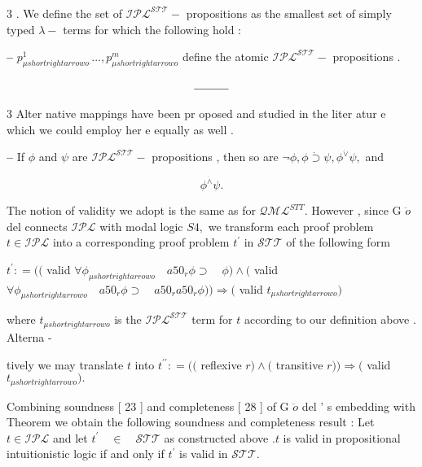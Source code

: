 \documentclass[10pt]{article}
\begin{document}
3 . \quad We define the set of  $ \mathcal{IPL} ^{ \mathcal{STT} } - $  propositions as the smallest set of simply typed 
  $ \lambda  - $  terms for which the following hold : 

\centerline{\textbf{-- }  $ p ^{ 1 }_{ \mu  shortrightarrow  o ^{ , }}  .   .   .   ,   p ^{ m }_{ \mu  shortrightarrow  o }$  define the atomic  $ \mathcal{IPL} ^{ \mathcal{STT} } - $  propositions . }

\begin{align*}
 \rule{3em}{0.4pt} 
\end{align*}

{\scriptsize 3 } {\small Alter native mappings have been pr oposed and studied in the liter atur e which we } 
 {\small could employ her e equally as well . } 


\newpage
\hspace*{\fill}\textbf{-- } If  $ \phi $  and  $ \psi $  are  $ \mathcal{IPL} ^{ \mathcal{STT} } - $  propositions , then so are  $\neg{ \dot{} }  \phi  ,   \phi   \dot{\supset}   \psi  ,   \phi ^{ \dot{\vee} }  \psi  , $  and 

\[ \phi ^{ \dot{\wedge} }  \psi  . \]


The notion of validity we adopt is the same as for  $ \mathcal{QML} ^{ STT } . $  However , since 
 G  $ \ddot{o} $  del connects  $ \mathcal{IPL} $  with modal logic  $ S  4  , $  we transform each proof problem 
  $ t   \in   \mathcal{IPL} $  into a corresponding proof problem  $ t ^{ \prime }$  in  $ \mathcal{STT} $  of the following form 

\noindent  $ t ^{ \prime }  :  =   (  ( $  valid  $ \forall  \phi _{ \mu  shortrightarrow  o } \quad  a50 _{ r }  \phi   \supset  \quad  \phi  )   \wedge   ( $  valid  $ \forall  \phi _{ \mu  shortrightarrow  o } \quad  a50 _{ r }  \phi   \supset  \quad  a50 _{ r }  a50 _{ r }  \phi  )  )   \Rightarrow   ( $  valid  $ t _{ \mu  shortrightarrow  o } ) $  

\noindent where  $ t _{ \mu  shortrightarrow  o }$  is the  $ \mathcal{IPL} ^{ \mathcal{STT} }$  term for  $ t $  according to our definition above . Alterna - 

\noindent tively we may translate  $ t $  into  $ t ^{ \prime  \prime }  :  =   (  ( $  reflexive  $ r  )   \wedge   ( $  transitive  $ r  )  )   \Rightarrow   ( $  valid  $ t _{ \mu  shortrightarrow  o } )  . $  

Combining soundness [ 23 ] and completeness [ 28 ] of G  $ \ddot{o} $  del ' s embedding with 
 Theorem  \quad we obtain the following soundness \quad and completeness \quad result : \quad Let 
  $ t   \in   \mathcal{IPL} $  and let  $ t ^{ \prime } \quad  \in  \quad  \mathcal{STT} $  as constructed above  $ .   t $  is valid in propositional 
 intuitionistic logic if and only if  $ t ^{ \prime }$  is valid in  $ \mathcal{STT}  . $  
\end{document}

